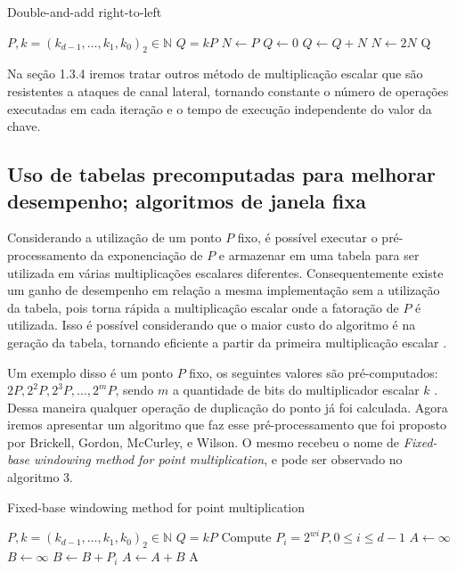 \begin{algorithm}[H]
\caption{Double-and-add right-to-left}
\begin{algorithmic} 
    \REQUIRE $P, k=(k_{d-1},\ldots,k_1,k_0)_2 \in \mathbb{N}$
    \ENSURE $Q = kP$
    \STATE $N \leftarrow P$
    \STATE $Q \leftarrow 0$
            \STATE $Q \leftarrow Q + N$
        \ENDIF
        \STATE $N \leftarrow 2N$
    \ENDFOR
    \RETURN Q
    \end{algorithmic}
\end{algorithm}

Na seção 1.3.4 iremos tratar outros método de multiplicação escalar que são resistentes a ataques de canal lateral, tornando constante o número de operações executadas em cada iteração e o tempo de execução independente do valor da chave.

\subsection{Uso de tabelas precomputadas para melhorar desempenho; algoritmos de janela fixa}
Considerando a utilização de um ponto $P$ fixo, é possível executar o pré-processamento da exponenciação de $P$ e armazenar em uma tabela para ser utilizada em várias multiplicações escalares diferentes. Consequentemente existe um ganho de desempenho em relação a mesma implementação sem a utilização da tabela, pois torna rápida a multiplicação escalar onde a fatoração de $P$ é utilizada. Isso é possível considerando que o maior custo do algoritmo é na geração da tabela, tornando eficiente a partir da primeira multiplicação escalar \cite{Hankerson:2003:GEC:940321}.

Um exemplo disso é um ponto $P$ fixo, os seguintes valores são pré-computados: $2P, 2^2P, 2^3P,..., 2^mP$, sendo $m$ a quantidade de bits do multiplicador escalar $k$ \cite{Hankerson:2003:GEC:940321}. Dessa maneira qualquer operação de duplicação do ponto já foi calculada. Agora iremos apresentar um algoritmo que faz esse pré-processamento que foi proposto por Brickell, Gordon, McCurley, e Wilson. O mesmo recebeu o nome de \textit{Fixed-base windowing method for point multiplication}, e pode ser observado no algoritmo 3.

\renewcommand{\algorithmicforall}{\textbf{for each}}

\begin{algorithm}[H]
\caption{Fixed-base windowing method for point multiplication}
\begin{algorithmic} 
    \REQUIRE $P, k=(k_{d-1},\ldots,k_1,k_0)_2 \in \mathbb{N}$
    \ENSURE $Q = kP$
    \STATE Compute $P_i = 2^{wi}P, 0 \le i \le d-1$
    \STATE $A \leftarrow \infty$
    \STATE $B \leftarrow \infty$
            \STATE $B \leftarrow B + P_i$
            \STATE $A \leftarrow A + B$
        \ENDFOR
    \ENDFOR
    \RETURN A
    \end{algorithmic}
\end{algorithm}


